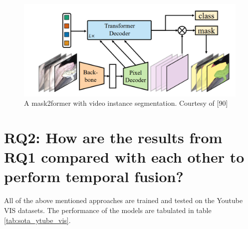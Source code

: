 	\begin{figure}
		\centering
		\includegraphics[width=13cm]{images/mask2former.png}
		\caption{ A mask2former with video instance segmentation. Courtesy of  [90]}
		\label{fig:mask2former}
	\end{figure}	
	
    \section{RQ2: How are the results from RQ1 compared with each other to perform temporal fusion?}
    
   	All of the above mentioned approaches are trained and tested on the Youtube VIS datasets. The performance of the models are tabulated in table \ref{tab:sota_ytube_vis}.
   

